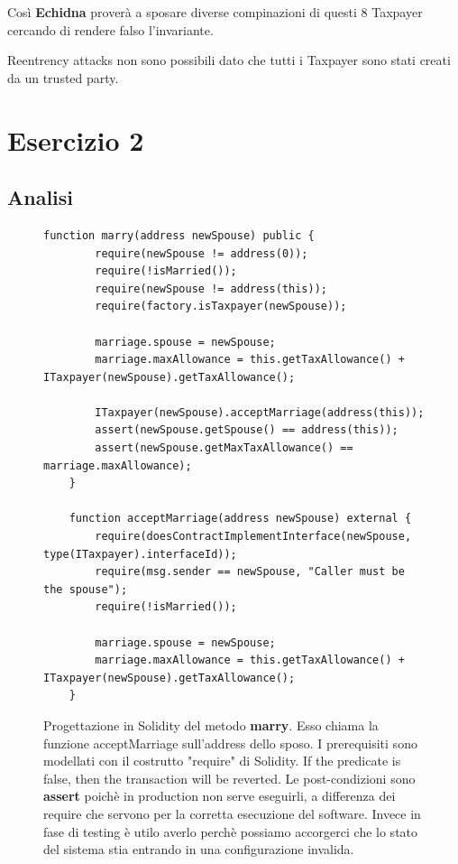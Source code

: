 \documentclass[conference]{IEEEtran}
\begin{document}
Così \textbf{Echidna} proverà a sposare diverse compinazioni di questi 8 Taxpayer cercando di rendere falso l'invariante.

Reentrency attacks non sono possibili dato che tutti i Taxpayer sono stati creati da un trusted party.


\section{Esercizio 2}

\subsection{Analisi}
\begin{figure}
	\centering
	\begin{lstlisting}[style=soliditystyle]
  function marry(address newSpouse) public {
        require(newSpouse != address(0));
        require(!isMarried());
        require(newSpouse != address(this));
        require(factory.isTaxpayer(newSpouse));

        marriage.spouse = newSpouse;
        marriage.maxAllowance = this.getTaxAllowance() + ITaxpayer(newSpouse).getTaxAllowance();

        ITaxpayer(newSpouse).acceptMarriage(address(this));
        assert(newSpouse.getSpouse() == address(this));
        assert(newSpouse.getMaxTaxAllowance() == marriage.maxAllowance);
    }

    function acceptMarriage(address newSpouse) external {
        require(doesContractImplementInterface(newSpouse, type(ITaxpayer).interfaceId));
        require(msg.sender == newSpouse, "Caller must be the spouse");
        require(!isMarried());

        marriage.spouse = newSpouse;
        marriage.maxAllowance = this.getTaxAllowance() + ITaxpayer(newSpouse).getTaxAllowance();
    }
\end{lstlisting}
	\caption{
		Progettazione in Solidity del metodo \textbf{marry}. Esso chiama la funzione acceptMarriage sull'address dello sposo.
		I prerequisiti sono modellati con il costrutto "require" di Solidity. If the predicate is false, then
		the transaction will be reverted.
		Le post-condizioni sono \textbf{assert} poichè in production non serve eseguirli, a differenza
		dei require che servono per la corretta esecuzione del software.
		Invece in fase di testing è utilo averlo perchè possiamo accorgerci che lo stato del sistema
		stia entrando in una configurazione invalida.
	}
	\label{code:marry2}
\end{figure}
\end{document}
